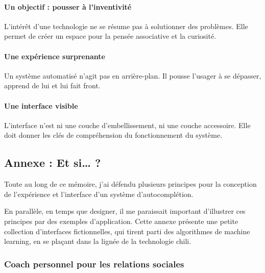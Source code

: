 \documentclass[]{article}
\let\oldparagraph\paragraph
\renewcommand{\paragraph}[1]{\oldparagraph{#1}\mbox{}}
\begin{document}
\hypertarget{un-objectif-pousser-uxe0-linventivituxe9}{%
\paragraph{Un objectif : pousser à
l'inventivité}\label{un-objectif-pousser-uxe0-linventivituxe9}}

L'intérêt d'une technologie ne se résume pas à solutionner des
problèmes. Elle permet de créer un espace pour la pensée associative et
la curiosité.

\hypertarget{une-expuxe9rience-surprenante}{%
\paragraph{Une expérience
surprenante}\label{une-expuxe9rience-surprenante}}

Un système automatisé n'agit pas en arrière-plan. Il pousse l'usager à
se dépasser, apprend de lui et lui fait front.

\hypertarget{une-interface-visible}{%
\paragraph{Une interface visible}\label{une-interface-visible}}

L'interface n'est ni une couche d'embellissement, ni une couche
accessoire. Elle doit donner les clés de compréhension du fonctionnement
du système.

\newpage

\hypertarget{annexe-et-si}{%
\subsection{Annexe : Et si\ldots{} ?}\label{annexe-et-si}}

Toute au long de ce mémoire, j'ai défendu plusieurs principes pour la
conception de l'expérience et l'interface d'un système d'autocomplétion.

En parallèle, en temps que designer, il me paraissait important
d'illustrer ces principes par des exemples d'application. Cette annexe
présente une petite collection d'interfaces fictionnelles, qui tirent
parti des algorithmes de machine learning, en se plaçant dans la lignée
de la technologie chili.

\newpage

\hypertarget{coach-personnel-pour-les-relations-sociales}{%
\subsubsection{Coach personnel pour les relations
sociales}\label{coach-personnel-pour-les-relations-sociales}}
\end{document}

